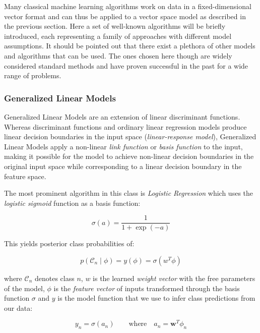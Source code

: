 Many classical machine learning algorithms work on data in a fixed-dimensional vector format and can thus be applied to a vector space model as described in the previous section. Here a set of well-known algorithms will be briefly introduced, each representing a family of approaches with different model assumptions. It should be pointed out that there exist a plethora of other models and algorithms that can be used. The ones chosen here though are widely considered standard methods and have proven successful in the past for a wide range of problems.

\subsubsection{Generalized Linear Models}
\label{subs:Generalized Linear Modelsl}

Generalized Linear Models are an extension of linear discriminant functions. Whereas discriminant functions and ordinary linear regression models produce linear decision boundaries in the input space (\emph{linear-response model}), Generalized Linear Models apply a non-linear \emph{link function} or \emph{basis function} to the input, making it possible for the model to achieve non-linear decision boundaries in the original input space while corresponding to a linear decision boundary in the feature space.

The most prominent algorithm in this class is \emph{Logistic Regression} which uses the \emph{logistic sigmoid} function as a basis function:

\begin{equation}
  \sigma (a) = \frac{1}{1 + \exp(-a)}
  \label{eq:sigmoid}
\end{equation}

This yields posterior class probabilities of:

\begin{equation}
  p(\mathcal{C}_n \mid \phi) = y(\phi) = \sigma(w^T  \phi)
\end{equation}

where $\mathcal{C}_n$ denotes class $n$, $w$ is the learned \emph{weight vector} with the free parameters of the model, $\phi$ is the \emph{feature vector} of inputs transformed through the basis function $\sigma$ and $y$ is the model function that we use to infer class predictions from our data:

\begin{equation}
  y_n = \sigma(a_n) \quad \quad \text{where} \quad a_n = \mathbf{w}^T \phi_n
\end{equation}

